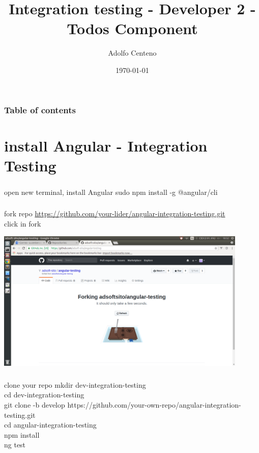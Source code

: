 \documentclass{beamer}
\begin{document}
\title{Integration testing - Developer 2 - Todos Component}  
\author{Adolfo Centeno}
\date{\today} 

\begin{frame}
\titlepage
\end{frame}

\begin{frame}\frametitle{Table of contents}\tableofcontents
\end{frame} 


\section{install Angular - Integration Testing} 

\begin{frame}\frametitle{} 


\begin{block}{open new terminal, install Angular}
sudo npm install -g @angular/cli
\end{block}

\end{frame}


\begin{frame}\frametitle{} 

\begin{block}{fork repo}
\url{https://github.com/your-lider/angular-integration-testing.git} \\
click in fork
\end{block}

\begin{center}
\includegraphics[width=0.9\textwidth]{forking.png}
\end{center}

\end{frame}




\begin{frame}\frametitle{} 

\begin{block}{clone your repo}
mkdir dev-integration-testing \\
cd dev-integration-testing	 \\
git clone -b develop https://github.com/your-own-repo/angular-integration-testing.git \\
cd angular-integration-testing \\
npm install \\
ng test   
\end{block}

\end{frame}
\end{document}
